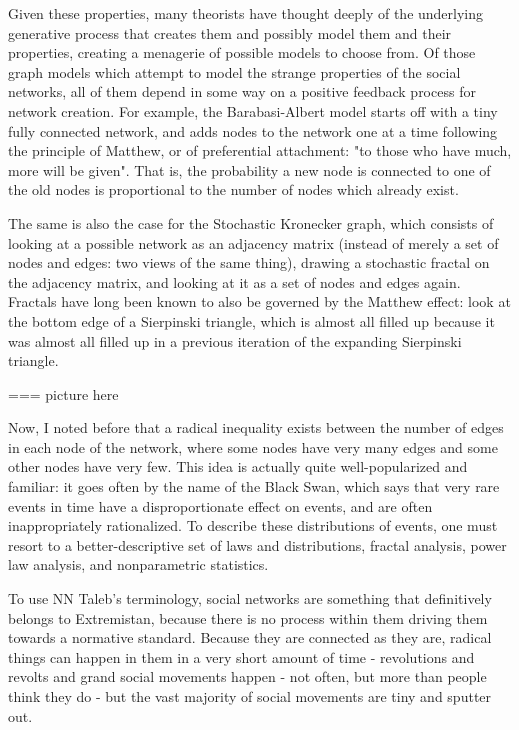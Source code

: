 \documentclass[12pt]{article}
\begin{document}
Given these properties, many theorists have thought deeply of the underlying generative process that creates them and possibly model them and their properties, creating a menagerie of possible models to choose from. Of those graph models which attempt to model the strange properties of the social networks, all of them depend in some way on a positive feedback process for network creation. For example, the Barabasi-Albert model starts off with a tiny fully connected network, and adds nodes to the network one at a time following the principle of Matthew, or of preferential attachment: "to those who have much, more will be given". That is, the probability a new node is connected to one of the old nodes is proportional to the number of nodes which already exist. 

The same is also the case for the Stochastic Kronecker graph, which consists of looking at a possible network as an adjacency matrix (instead of merely a set of nodes and edges: two views of the same thing), drawing a stochastic fractal on the adjacency matrix, and looking at it as a set of nodes and edges again. Fractals have long been known to also be governed by the Matthew effect: look at the bottom edge of a Sierpinski triangle, which is almost all filled up because it was almost all filled up in a previous iteration of the expanding Sierpinski triangle.

=== picture here

Now, I noted before that a radical inequality exists between the number of edges in each node of the network, where some nodes have very many edges and some other nodes have very few. This idea is actually quite well-popularized and familiar: it goes often by the name of the Black Swan, which says that very rare events in time have a disproportionate effect on events, and are often inappropriately rationalized. To describe these distributions of events, one must resort to a better-descriptive set of laws and distributions, fractal analysis, power law analysis, and nonparametric statistics.

To use NN Taleb's terminology, social networks are something that definitively belongs to Extremistan, because there is no process within them driving them towards a normative standard. Because they are connected as they are, radical things can happen in them in a very short amount of time - revolutions and revolts and grand social movements happen - not often, but more than people think they do - but the vast majority of social movements are tiny and sputter out.
\end{document}

